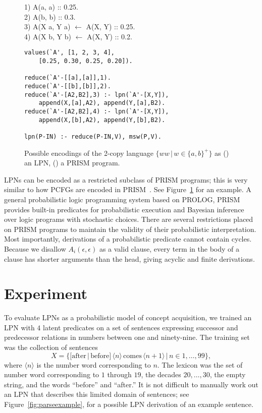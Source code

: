 \documentclass{article} %
\begin{document}
\begin{figure}[t]
	\centering
	\begin{minipage}[b]{0.8\linewidth}
1) A(a, a) :: 0.25. \\
2) A(b, b) :: 0.3. \\
3) A(X a, Y a) $\leftarrow$ A(X, Y) :: 0.25. \\
4) A(X b, Y b) $\leftarrow$ A(X, Y) :: 0.2.
		\subcaption{}
		\label{fig:grammar}
	\end{minipage}
	\begin{minipage}[b]{0.8\linewidth}
        \fontsize{9}{10.5}\selectfont\ttfamily
		\begin{verbatim}
values(`A', [1, 2, 3, 4],
    [0.25, 0.30, 0.25, 0.20]).

reduce(`A'-[[a],[a]],1).
reduce(`A'-[[b],[b]],2).
reduce(`A'-[A2,B2],3) :- lpn(`A'-[X,Y]),
    append(X,[a],A2), append(Y,[a],B2).
reduce(`A'-[A2,B2],4) :- lpn(`A'-[X,Y]),
    append(X,[b],A2), append(Y,[b],B2).

lpn(P-IN) :- reduce(P-IN,V), msw(P,V).
		\end{verbatim}
		\subcaption{}
		\label{fig:prism}
	\end{minipage}
	\caption{Possible encodings of the 2-copy language $\{ww\,|\, w \in \{a,b\}^+\}$ as () an LPN, () a PRISM program.}
	\label{fig:copy}
\end{figure}

LPNs can be encoded as a restricted subclass of PRISM programs; this
is very similar to how PCFGs are encoded in
PRISM~\cite{DBLP:conf/cl/2000}. See Figure~\ref{fig:copy} for an
example. A general probabilistic logic programming system based on
PROLOG, PRISM provides built-in predicates for probabilistic execution
and Bayesian inference over logic programs with stochastic
choices. There are several restrictions placed on PRISM programs to
maintain the validity of their probabilistic interpretation. Most
importantly, derivations of a probabilistic predicate cannot contain
cycles. Because we disallow $A_i(\epsilon,\epsilon)$ as a valid
clause, every term in the body of a clause has shorter arguments than
the head, giving acyclic and finite derivations.

\section{Experiment}

To evaluate LPNs as a probabilistic model of concept acquisition, we
trained an LPN with $4$ latent predicates on a set of sentences
expressing successor and predecessor relations in numbers between one
and ninety-nine. The training set was the collection of sentences $$X
= \{[\text{after}\, | \, \text{before}] \, \langle n \rangle \,
\text{comes} \, \langle n+1 \rangle \,|\, n \in 1,\dots,99\},$$ where
$\langle n \rangle$ is the number word corresponding to $n$. The
lexicon was the set of number word corresponding to $1$ through $19$,
the decades $20, \dots, 30$, the empty string, and the words
``before'' and ``after.'' It is not difficult to manually work out an
LPN that describes this limited domain of sentences; see
Figure~\ref{fig:parseexample}, for a possible LPN derivation of an
example sentence.
\end{document}
